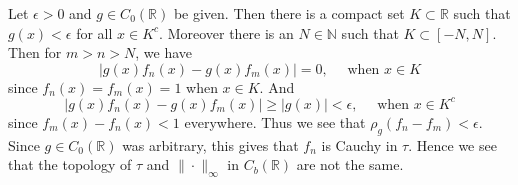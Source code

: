 \documentclass[12pt]{exam}
\theoremstyle{plain} %
\theoremstyle{definition} %
\theoremstyle{remark} %
\begin{document}
\begin{questions}
\begin{solution}
\begin{parts}
      Let $\epsilon> 0$ and $g \in C_0(\mathbb{R})$ be given. Then
      there is a  compact set $K \subset \mathbb{R}$ such that $g(x)
      < \epsilon$ for all $x \in K^c$. Moreover there is an $N \in
      \mathbb{N}$ such that $K \subset [-N, N]$. Then for $m > n >
      N$, we have \[
        |g(x)f_n(x) - g(x)f_m(x)| = 0, \quad \textrm{ when } x \in K
      \]
      since $f_n(x) = f_m(x) = 1$ when $x \in K$. And \[
        |g(x)f_n(x) - g(x)f_m(x)| \ge |g(x)| < \epsilon, \quad
        \textrm{ when } x \in K^c
      \]
      since $f_m(x) - f_n(x) < 1$ everywhere.
      Thus we see that $\rho_g(f_n - f_m) < \epsilon$. Since $g \in
      C_0(\mathbb{R})$ was arbitrary, this gives that $f_n$ is Cauchy
      in $\tau$. Hence we see that the topology of $\tau$ and
      $\|\cdot\|_\infty$ in $C_b(\mathbb{R})$ are not the same.
    \end{parts}
  \end{solution}

\end{questions}
\printbibliography[heading=bibintoc]
\end{document}
